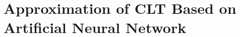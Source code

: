 
\chapter{Approximation of CLT Based on Artificial Neural Network} %

\label{Chapter5} %








%
%


